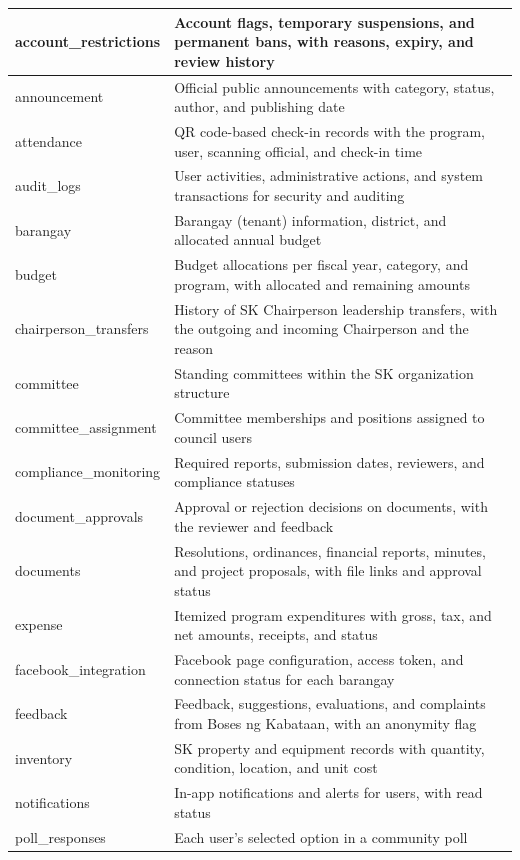 \begin{longtable}{|p{4.5cm}|p{9.5cm}|}
account\_restrictions & Account flags, temporary suspensions, and permanent bans, with reasons, expiry, and review history \\ \hline
announcement & Official public announcements with category, status, author, and publishing date \\ \hline
attendance & QR code-based check-in records with the program, user, scanning official, and check-in time \\ \hline
audit\_logs & User activities, administrative actions, and system transactions for security and auditing \\ \hline
barangay & Barangay (tenant) information, district, and allocated annual budget \\ \hline
budget & Budget allocations per fiscal year, category, and program, with allocated and remaining amounts \\ \hline
chairperson\_transfers & History of SK Chairperson leadership transfers, with the outgoing and incoming Chairperson and the reason \\ \hline
committee & Standing committees within the SK organization structure \\ \hline
committee\_assignment & Committee memberships and positions assigned to council users \\ \hline
compliance\_monitoring & Required reports, submission dates, reviewers, and compliance statuses \\ \hline
document\_approvals & Approval or rejection decisions on documents, with the reviewer and feedback \\ \hline
documents & Resolutions, ordinances, financial reports, minutes, and project proposals, with file links and approval status \\ \hline
expense & Itemized program expenditures with gross, tax, and net amounts, receipts, and status \\ \hline
facebook\_integration & Facebook page configuration, access token, and connection status for each barangay \\ \hline
feedback & Feedback, suggestions, evaluations, and complaints from Boses ng Kabataan, with an anonymity flag \\ \hline
inventory & SK property and equipment records with quantity, condition, location, and unit cost \\ \hline
notifications & In-app notifications and alerts for users, with read status \\ \hline
poll\_responses & Each user's selected option in a community poll \\ \hline

\end{longtable}
